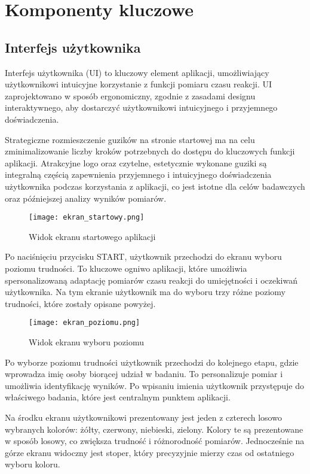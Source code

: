 \section{Komponenty kluczowe}
\subsection{Interfejs użytkownika}
Interfejs użytkownika (UI) to kluczowy element aplikacji, umożliwiający użytkownikowi intuicyjne korzystanie z funkcji pomiaru czasu reakcji. UI zaprojektowano w sposób ergonomiczny, zgodnie z zasadami designu interaktywnego, aby dostarczyć użytkownikowi intuicyjnego i przyjemnego doświadczenia.

Strategiczne rozmieszczenie guzików na stronie startowej ma na celu zminimalizowanie liczby kroków potrzebnych do dostępu do kluczowych funkcji aplikacji. Atrakcyjne logo oraz czytelne, estetycznie wykonane guziki są integralną częścią zapewnienia przyjemnego i intuicyjnego doświadczenia użytkownika podczas korzystania z aplikacji, co jest istotne dla celów badawczych oraz późniejszej analizy wyników pomiarów.
\begin{figure}[!htb]
    \centering
    \texttt{[image: ekran\_startowy.png]}
    \caption{Widok ekranu startowego aplikacji}
\end{figure}

Po naciśnięciu przycisku START, użytkownik przechodzi do ekranu wyboru poziomu trudności. To kluczowe ogniwo aplikacji, które umożliwia spersonalizowaną adaptację pomiarów czasu reakcji do umiejętności i oczekiwań użytkownika. Na tym ekranie użytkownik ma do wyboru trzy różne poziomy trudności, które zostały opisane powyżej.
\begin{figure}[!htb]
    \centering
    \texttt{[image: ekran\_poziomu.png]}
    \caption{Widok ekranu wyboru poziomu}
\end{figure}

Po wyborze poziomu trudności użytkownik przechodzi do kolejnego etapu, gdzie wprowadza imię osoby biorącej udział w badaniu. To personalizuje pomiar i umożliwia identyfikację wyników. Po wpisaniu imienia użytkownik przystępuje do właściwego badania, które jest centralnym punktem aplikacji.

Na środku ekranu użytkownikowi prezentowany jest jeden z czterech losowo wybranych kolorów: żółty, czerwony, niebieski, zielony. Kolory te są prezentowane w sposób losowy, co zwiększa trudność i różnorodność pomiarów. Jednocześnie na górze ekranu widoczny jest stoper, który precyzyjnie mierzy czas od ostatniego wyboru koloru.

